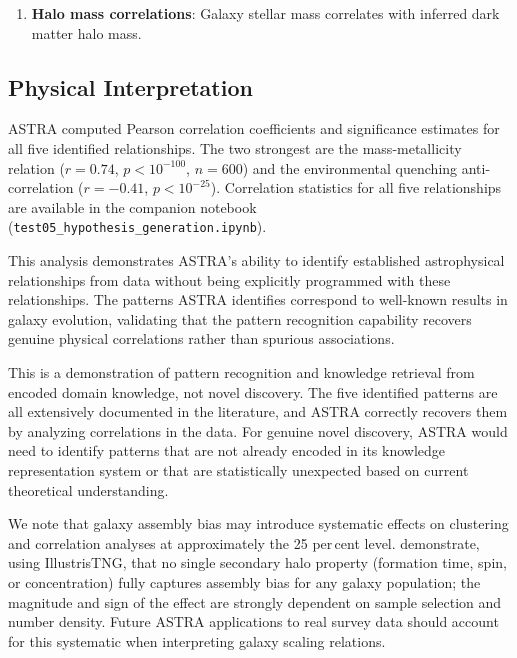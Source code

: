 \documentclass[usenatbib]{rasti}
\begin{document}
\begin{enumerate}
\item \textbf{Halo mass correlations}: Galaxy stellar mass correlates with inferred dark matter halo mass.
\end{enumerate}

\subsection{Physical Interpretation}

ASTRA computed Pearson correlation coefficients and significance estimates for all five identified relationships. The two strongest are the mass-metallicity relation ($r = 0.74$, $p < 10^{-100}$, $n = 600$) and the environmental quenching anti-correlation ($r = -0.41$, $p < 10^{-25}$). Correlation statistics for all five relationships are available in the companion notebook (\texttt{test05\_hypothesis\_generation.ipynb}).

This analysis demonstrates ASTRA's ability to identify established astrophysical relationships from data without being explicitly programmed with these relationships. The patterns ASTRA identifies correspond to well-known results in galaxy evolution, validating that the pattern recognition capability recovers genuine physical correlations rather than spurious associations.

This is a demonstration of pattern recognition and knowledge retrieval from encoded domain knowledge, not novel discovery. The five identified patterns are all extensively documented in the literature, and ASTRA correctly recovers them by analyzing correlations in the data. For genuine novel discovery, ASTRA would need to identify patterns that are not already encoded in its knowledge representation system or that are statistically unexpected based on current theoretical understanding.

We note that galaxy assembly bias may introduce systematic effects on clustering and correlation analyses at approximately the 25 per\,cent level. \citet{garciamoreno2026} demonstrate, using IllustrisTNG, that no single secondary halo property (formation time, spin, or concentration) fully captures assembly bias for any galaxy population; the magnitude and sign of the effect are strongly dependent on sample selection and number density. Future ASTRA applications to real survey data should account for this systematic when interpreting galaxy scaling relations.
\end{document}
